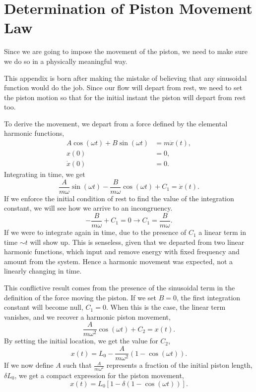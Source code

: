 \documentclass[../../thesis.tex]{subfiles}
\begin{document}
\section{Determination of Piston Movement Law}
Since we are going to impose the movement of the piston, we need to make sure 
we do so in a physically meaningful way.

This appendix is born after making the mistake of believing that any sinusoidal function would do the job.
Since our flow will depart from rest, 
we need to set the piston motion so that for the initial instant the piston will depart from rest too.

To derive the movement, we depart from a force defined by the elemental harmonic functions,
\begin{subequations}
\begin{align}
        A \cos(\omega t) + B \sin(\omega t) &= m \ddot{x}(t), 
        \\
        x(0) &= 0, 
        \\
        \dot{x}(0) &= 0.
\end{align}
\end{subequations}
Integrating in time, we get
\begin{equation}
    \frac{A}{m \omega} \sin(\omega t) - \frac{B}{m \omega} \cos(\omega t) + C_1 = \dot{x}(t).
\end{equation}
If we enforce the initial condition of rest to find the value of the integration constant, 
we will see how we arrive to an incongruency.
\begin{equation}
    - \frac{B}{m \omega} + C_1 = 0 \rightarrow C_1 = \frac{B}{m \omega}.
\end{equation}
If we were to integrate again in time, 
due to the presence of $C_1$ a linear term in time $\sim t$ will show up.
This is senseless, given that we departed from two linear harmonic functions, 
which input and remove energy with fixed frequency and amount from the system. 
Hence a harmonic movement was expected, not a linearly changing in time.

This conflictive result comes from the presence of the sinusoidal term in the definition of the force moving the piston.
If we set $B=0$, the first integration constant will become null, $C_1=0$. 
When this is the case, the linear term vanishes, and we recover a harmonic piston movement,
\begin{equation}
    \frac{A}{m \omega^2} \cos(\omega t) + C_2 = x(t).
\end{equation}
By setting the initial location, we get the value for $C_2$,
\begin{equation}
    x(t) = L_0 - \frac{A}{m \omega^2} \left(1 - \cos(\omega t)\right).
\end{equation}
If we now define $A$ such that $\frac{A}{m \omega^2}$ represents a fraction of the initial piston length, $\delta L_0$, 
we get a compact expression for the piston movement,
\begin{equation}
    x(t) = L_0\left[1 - \delta \left(1 - \cos(\omega t)\right)\right].
\end{equation}
\end{document}
